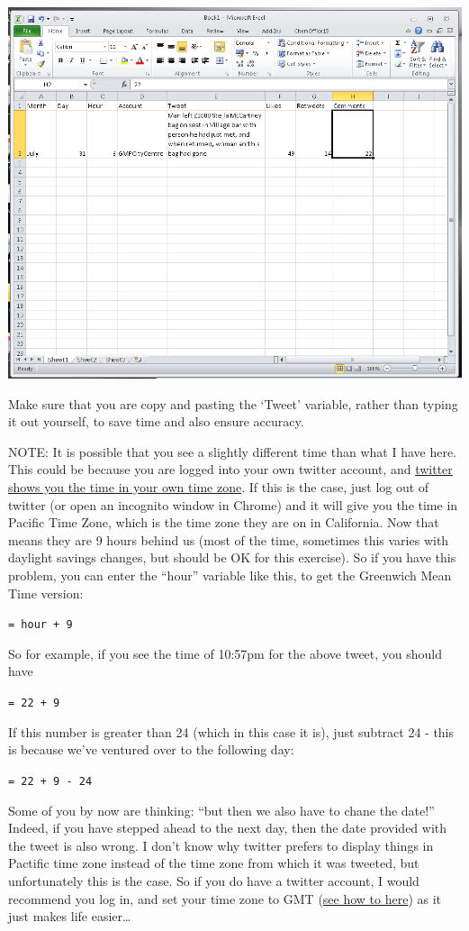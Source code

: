 \documentclass[]{book}
\theoremstyle{definition}
\theoremstyle{definition}
\theoremstyle{definition}
\theoremstyle{remark}
\begin{document}
\includegraphics{imgs/tweet1_entered.png}

Make sure that you are copy and pasting the `Tweet' variable, rather
than typing it out yourself, to save time and also ensure accuracy.

NOTE: It is possible that you see a slightly different time than what I
have here. This could be because you are logged into your own twitter
account, and
\href{http://www.adweek.com/digital/tweet-timestamps/}{twitter shows you
the time in your own time zone}. If this is the case, just log out of
twitter (or open an incognito window in Chrome) and it will give you the
time in Pacific Time Zone, which is the time zone they are on in
California. Now that means they are 9 hours behind us (most of the time,
sometimes this varies with daylight savings changes, but should be OK
for this exercise). So if you have this problem, you can enter the
``hour'' variable like this, to get the Greenwich Mean Time version:

\texttt{=\ hour\ +\ 9}

So for example, if you see the time of 10:57pm for the above tweet, you
should have

\texttt{=\ 22\ +\ 9}

If this number is greater than 24 (which in this case it is), just
subtract 24 - this is because we've ventured over to the following day:

\texttt{=\ 22\ +\ 9\ -\ 24}

Some of you by now are thinking: ``but then we also have to chane the
date!'' Indeed, if you have stepped ahead to the next day, then the date
provided with the tweet is also wrong. I don't know why twitter prefers
to display things in Pactific time zone instead of the time zone from
which it was tweeted, but unfortunately this is the case. So if you do
have a twitter account, I would recommend you log in, and set your time
zone to GMT (\href{https://support.twitter.com/articles/20169405}{see
how to here}) as it just makes life easier\ldots{}
\end{document}
